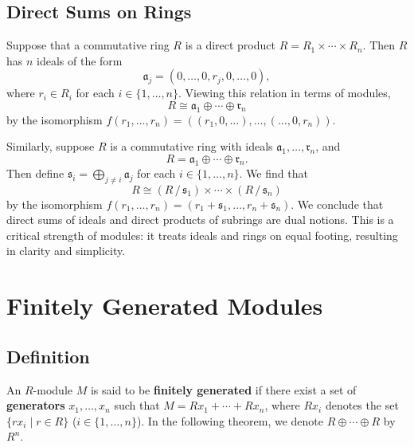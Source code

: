 \documentclass[11pt]{article}
\begin{document}
\newpage

\subsection{Direct Sums on Rings}

Suppose that a commutative ring $R$ is a direct product $R = R_{1} \times \cdots \times R_{n}$. Then $R$ has $n$ ideals of the form
\[
	\mathfrak{a}_{j} = (0, \ldots, 0, r_{j}, 0, \ldots, 0),
\]
where $r_{i} \in R_{i}$ for each $i \in \{ 1, \ldots, n \}$. Viewing this relation in terms of modules,
\[
	R \cong \mathfrak{a}_{1} \oplus \cdots \oplus \mathfrak{r}_{n}
\]
by the isomorphism $f(r_{1}, \ldots, r_{n}) = ((r_{1}, 0, \ldots), \ldots, (\ldots, 0, r_{n}))$.

Similarly, suppose $R$ is a commutative ring with ideals $\mathfrak{a}_{1}, \ldots, \mathfrak{r}_{n}$, and
\[
	R = \mathfrak{a}_{1} \oplus \cdots \oplus \mathfrak{r}_{n}.
\]
Then define $\mathfrak{s}_{i} = \bigoplus_{j \ne i} \mathfrak{a}_{j}$ for each $i \in \{ 1, \ldots, n \}$. We find that
\[
	R \cong (R \,/\, \mathfrak{s}_{1}) \times \cdots \times (R \,/\, \mathfrak{s}_{n})
\]
by the isomorphism $f(r_{1}, \ldots, r_{n}) = (r_{1} + \mathfrak{s}_{1}, \ldots, r_{n} + \mathfrak{s}_{n})$. We conclude that direct sums of ideals and direct products of subrings are dual notions. This is a critical strength of modules: it treats ideals and rings on equal footing, resulting in clarity and simplicity.


\section{Finitely Generated Modules}


\subsection{Definition}

An $R$-module $M$ is said to be \textbf{finitely generated} if there exist a set of \textbf{generators} $x_{1}, \ldots, x_{n}$ such that $M = Rx_{1} + \cdots + Rx_{n}$, where $Rx_{i}$ denotes the set $\{ rx_{i} \mid r \in R \}$ ($i \in \{ 1, \ldots, n \}$). In the following theorem, we denote $R \oplus \cdots \oplus R$ by $R^{n}$.
\end{document}
